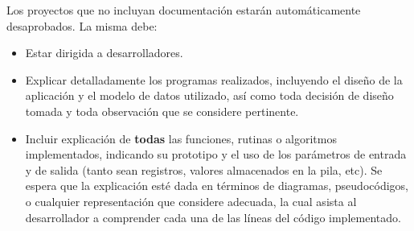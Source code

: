 \documentclass[12pt,a4paper]{article}
\begin{document}
Los proyectos que no incluyan documentación estarán automáticamente desaprobados. La misma debe:
\begin{itemize}
	
	\item Estar dirigida a desarrolladores.
	
	\item Explicar detalladamente los programas realizados, incluyendo el diseño de la aplicación y el modelo de datos utilizado, así como toda decisión de diseño tomada y toda observación que se considere pertinente.
	
	\item Incluir explicación de \textbf{todas} las funciones, rutinas o algoritmos implementados, indicando su prototipo y el uso de los parámetros de entrada y de salida (tanto sean registros, valores almacenados en la pila, etc). Se espera que la explicación esté dada en términos de diagramas, pseudocódigos, o cualquier representación que considere adecuada, la cual asista al desarrollador a comprender cada una de las líneas del código implementado.
	
\end{itemize}
\end{document}
